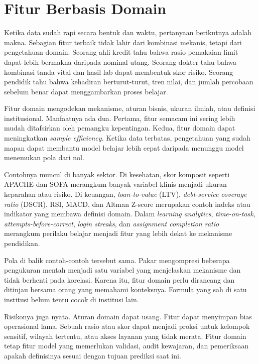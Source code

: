 \section{Fitur Berbasis Domain}\label{fitur-berbasis-domain}

Ketika data sudah rapi secara bentuk dan waktu, pertanyaan berikutnya adalah makna. Sebagian fitur terbaik tidak lahir dari kombinasi mekanis, tetapi dari pengetahuan domain. Seorang ahli kredit tahu bahwa rasio pemakaian limit dapat lebih bermakna daripada nominal utang. Seorang dokter tahu bahwa kombinasi tanda vital dan hasil lab dapat membentuk skor risiko. Seorang pendidik tahu bahwa kehadiran berturut-turut, tren nilai, dan jumlah percobaan sebelum benar dapat menggambarkan proses belajar.

Fitur domain mengodekan mekanisme, aturan bisnis, ukuran ilmiah, atau definisi institusional. Manfaatnya ada dua. Pertama, fitur semacam ini sering lebih mudah ditafsirkan oleh pemangku kepentingan. Kedua, fitur domain dapat meningkatkan \emph{sample efficiency}. Ketika data terbatas, pengetahuan yang sudah mapan dapat membantu model belajar lebih cepat daripada menunggu model menemukan pola dari nol.

Contohnya muncul di banyak sektor. Di kesehatan, skor komposit seperti APACHE dan SOFA merangkum banyak variabel klinis menjadi ukuran keparahan atau risiko. Di keuangan, \emph{loan-to-value} (LTV), \emph{debt-service coverage ratio} (DSCR), RSI, MACD, dan Altman Z-score merupakan contoh indeks atau indikator yang membawa definisi domain. Dalam \emph{learning analytics}, \emph{time-on-task}, \emph{attempts-before-correct}, \emph{login streaks}, dan \emph{assignment completion ratio} merangkum perilaku belajar menjadi fitur yang lebih dekat ke mekanisme pendidikan.

Pola di balik contoh-contoh tersebut sama. Pakar mengompresi beberapa pengukuran mentah menjadi satu variabel yang menjelaskan mekanisme dan tidak berhenti pada korelasi. Karena itu, fitur domain perlu dirancang dan ditinjau bersama orang yang memahami konteksnya. Formula yang sah di satu institusi belum tentu cocok di institusi lain.

Risikonya juga nyata. Aturan domain dapat usang. Fitur dapat menyimpan bias operasional lama. Sebuah rasio atau skor dapat menjadi proksi untuk kelompok sensitif, wilayah tertentu, atau akses layanan yang tidak merata. Fitur domain tetap fitur model yang memerlukan validasi, audit kewajaran, dan pemeriksaan apakah definisinya sesuai dengan tujuan prediksi saat ini.

